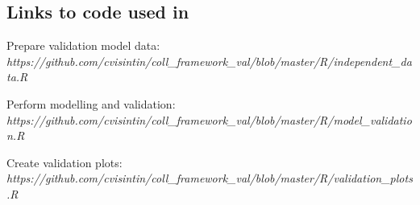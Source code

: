 
\subsection{Links to code used in }

\noindent Prepare validation model data:\\
\textit{https://github.com/cvisintin/coll\_framework\_val/blob/master/R/independent\_data.R}
%

\vspace{.3cm}
\noindent Perform modelling and validation:\\
\textit{https://github.com/cvisintin/coll\_framework\_val/blob/master/R/model\_validation.R}
%

\vspace{.3cm}
\noindent Create validation plots:\\
\textit{https://github.com/cvisintin/coll\_framework\_val/blob/master/R/validation\_plots.R}
%